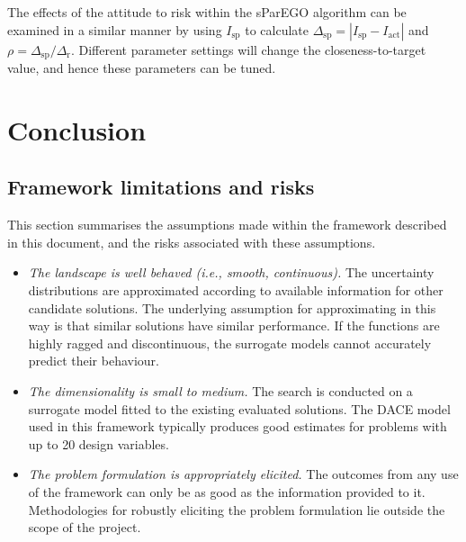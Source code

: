 \documentclass[10pt]{llncs}
\newcommand{\brabs}[1]{\left\vert{#1}\right\vert} %
\begin{document}
The effects of the attitude to risk within the sParEGO algorithm can be examined in a similar manner by using $I_\text{sp}$ to calculate $\Delta_\text{sp} = \brabs{I_\text{sp}-I_\text{act}}$ and $\rho = \Delta_\text{sp} / \Delta_\text{r}$. Different parameter settings will change the closeness-to-target value, and hence these parameters can be tuned.


\section{Conclusion}
\label{sec:conclusion}

\subsection{Framework limitations and risks}
This section summarises the assumptions made within the framework described in this document, and the risks associated with these assumptions.
\begin{itemize}
	\item \emph{The landscape is well behaved (i.e., smooth, continuous).} The uncertainty distributions are approximated according to available information for other candidate solutions. The underlying assumption for approximating in this way is that similar solutions have similar performance. If the functions are highly ragged and discontinuous, the surrogate models cannot accurately predict their behaviour.
	\item \emph{The dimensionality is small to medium.} The search is conducted on a surrogate model fitted to the existing evaluated solutions. The DACE model used in this framework typically produces good estimates for problems with up to 20 design variables.
	\item \emph{The problem formulation is appropriately elicited.} The outcomes from any use of the framework can only be as good as the information provided to it. Methodologies for robustly eliciting the problem formulation lie outside the scope of the project.
\end{itemize}




\end{document}
